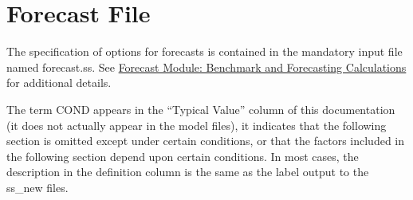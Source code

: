 \section{Forecast File}
The specification of options for forecasts is contained in the mandatory input file named forecast.ss. See \hyperref[sec:forecast]{Forecast Module: Benchmark and Forecasting Calculations} for additional details. 

The term COND appears in the ``Typical Value'' column of this documentation (it does not actually appear in the model files), it indicates that the following section is omitted except under certain conditions, or that the factors included in the following section depend upon certain conditions. In most cases, the description in the definition column is the same as the label output to the ss\_new files.


